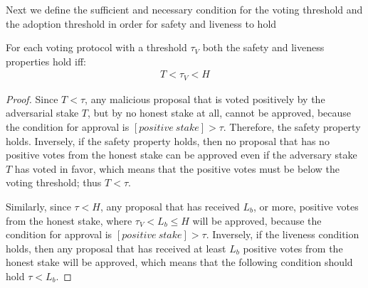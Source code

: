 Next we define the sufficient and necessary condition for the voting threshold 
and the adoption threshold in order for safety and liveness to hold
\begin{theorem}\label{th:safety_and_liveness_condition_voting}
	For each voting protocol with a threshold $\tau_V$ 
	both the safety and liveness properties hold iff:
	\begin{align*} 
		T < \tau_V < H 
	\end{align*}
	\begin{proof}
		Since $T < \tau$, any malicious proposal that is voted positively by 
		the adversarial stake $T$, but by no honest stake at all, cannot be 
		approved, because the condition for approval is $[positive\ stake] > 
		\tau$. Therefore, the safety property holds. Inversely, if the safety 
		property holds, then no proposal that has no positive votes from the 
		honest stake can be approved even if the adversary stake $T$ has 
		voted in favor, which means that the positive votes must be below the 
		voting threshold; thus $T < \tau$. 
		
		Similarly, since $\tau < H$, any proposal that has 
		received $L_b$, or more, positive votes from the honest stake, where $ 
		\tau_V < L_b \leq H$ will be 
		approved, because the condition for approval is $[positive\ stake] > 
		\tau$. Inversely, if the liveness condition holds, then any proposal 
		that has received at least $L_b$ positive votes from the honest stake 
		will be approved, which means that the following 
		condition should hold $\tau < L_b$.
	\end{proof}
\end{theorem}


